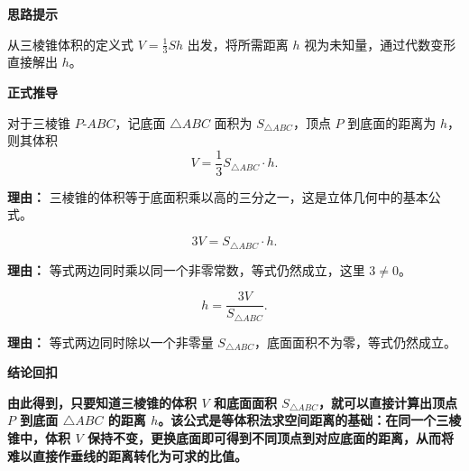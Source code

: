 \begin{proofbox}

	\textbf{\textcolor{CProof}{思路提示}}

	从三棱锥体积的定义式 $V=\frac13 S h$ 出发，将所需距离 $h$ 视为未知量，通过代数变形直接解出 $h$。

	\medskip

	\textbf{\textcolor{CProof}{正式推导}}

	\begin{description}[style=nextline, leftmargin=2.8em, labelsep=0.5em, itemsep=0.55em]
		\item[\textbf{步骤一（列体积公式）：}]
		      对于三棱锥 $P\text{-}ABC$，记底面 $\triangle ABC$ 面积为 $S_{\triangle ABC}$，顶点 $P$ 到底面的距离为 $h$，则其体积
		      \[
			      V = \frac13 S_{\triangle ABC} \cdot h.
		      \]

		      \par\textbf{理由：}
		      三棱锥的体积等于底面积乘以高的三分之一，这是立体几何中的基本公式。

		\item[\textbf{步骤二（等号两边同时乘以3）：}]
		      \[
			      3V = S_{\triangle ABC} \cdot h.
		      \]

		      \par\textbf{理由：}
		      等式两边同时乘以同一个非零常数，等式仍然成立，这里 $3\neq 0$。

		\item[\textbf{步骤三（两边同时除以$S_{\triangle ABC}$）：}]
		      \[
			      h = \frac{3V}{S_{\triangle ABC}}.
		      \]

		      \par\textbf{理由：}
		      等式两边同时除以一个非零量 $S_{\triangle ABC}$，底面面积不为零，等式仍然成立。
	\end{description}

	\medskip

	\textbf{\textcolor{CProof}{结论回扣}}

	\textbf{由此得到，只要知道三棱锥的体积 $V$ 和底面面积 $S_{\triangle ABC}$，就可以直接计算出顶点 $P$ 到底面 $\triangle ABC$ 的距离 $h$。该公式是等体积法求空间距离的基础：在同一个三棱锥中，体积 $V$ 保持不变，更换底面即可得到不同顶点到对应底面的距离，从而将难以直接作垂线的距离转化为可求的比值。}

\end{proofbox}